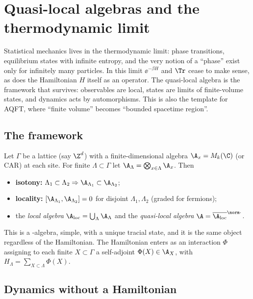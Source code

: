 \chapter{Quasi-local algebras and the thermodynamic limit}\label{ch:quasilocal}

\begin{physmotiv}
Statistical mechanics lives in the thermodynamic limit: phase transitions, equilibrium states with infinite entropy, and the very notion of a ``phase'' exist only for infinitely many particles. In this limit $\ee^{-\beta H}$ and $\Tr$ cease to make sense, as does the Hamiltonian $H$ itself as an operator. The quasi-local algebra is the framework that survives: observables are local, states are limits of finite-volume states, and dynamics acts by automorphisms. This is also the template for AQFT, where ``finite volume'' becomes ``bounded spacetime region''.
\end{physmotiv}

\section{The framework}

Let $\Gamma$ be a lattice (say $\Z^d$) with a finite-dimensional algebra $\A_x=M_k(\C)$ (or CAR) at each site. For finite $\Lambda\subset\Gamma$ let $\A_\Lambda=\bigotimes_{x\in\Lambda}\A_x$. Then
\begin{itemize}
\item \textbf{isotony:} $\Lambda_1\subset\Lambda_2\Rightarrow\A_{\Lambda_1}\subset\A_{\Lambda_2}$;
\item \textbf{locality:} $[\A_{\Lambda_1},\A_{\Lambda_2}]=0$ for disjoint $\Lambda_1,\Lambda_2$ (graded for fermions);
\item the \emph{local algebra} $\A_{\rm loc}=\bigcup_\Lambda\A_\Lambda$ and the \emph{quasi-local algebra} $\A=\overline{\A_{\rm loc}}^{\norm\cdot}$.
\end{itemize}
This is a \cstar-algebra, simple, with a unique tracial state, and it is the same object regardless of the Hamiltonian. The Hamiltonian enters as an interaction $\Phi$ assigning to each finite $X\subset\Gamma$ a self-adjoint $\Phi(X)\in\A_X$, with $H_\Lambda=\sum_{X\subset\Lambda}\Phi(X)$.

\section{Dynamics without a Hamiltonian}

